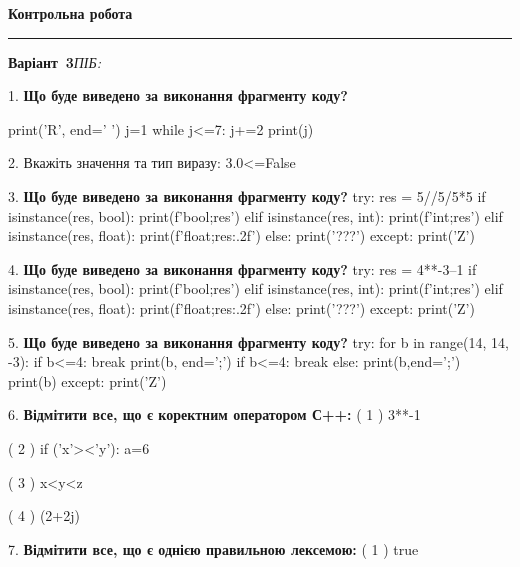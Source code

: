 \documentclass[11pt]{article}
\begin{document}
{\centering\Large\bfseries Контрольна робота\par}
\medskip
\noindent\rule{\linewidth}{0.5pt}
\smallskip
\noindent\textbf{Варіант \No\,3}\hfill \textit{ПІБ:}\,\underline{\hspace{60mm}}
\vspace{4mm}

1. \textbf{Що буде виведено за виконання фрагменту коду?}

print('R', end=' ')
j=1
while j<=7:
    j+=2
print(j)

\vspace{5mm}

2. 
Вкажіть значення та тип виразу:
3.0<=False
\vspace{5mm}

3. \textbf{Що буде виведено за виконання фрагменту коду?}
try:
    res = 5//5/5*5
    if isinstance(res, bool):
        print(f'bool;{res}')
    elif isinstance(res, int):
        print(f'int;{res}')
    elif isinstance(res, float):
        print(f'float;{res:.2f}')
    else:
        print('???')
except:
    print('Z')
\vspace{5mm}

4. \textbf{Що буде виведено за виконання фрагменту коду?}
try:
    res = 4**-3--1
    if isinstance(res, bool):
        print(f'bool;{res}')
    elif isinstance(res, int):
        print(f'int;{res}')
    elif isinstance(res, float):
        print(f'float;{res:.2f}')
    else:
        print('???')
except:
    print('Z')
\vspace{5mm}

5. \textbf{Що буде виведено за виконання фрагменту коду?}
try:
    for b in range(14, 14, -3):
        if b<=4:
            break
        print(b, end=';')
        if b<=4:
            break
    else:
        print(b,end=';')
    print(b)
except:
    print('Z')
\vspace{5mm}

6. %
\textbf{Відмітити все, що є коректним оператором С++:}
( 1 ) 3**-1

( 2 ) if ('x'><'y'): a=6

( 3 ) x<y<z

( 4 ) (2+2j)%
\vspace{5mm}

7. %
\textbf{Відмітити все, що є однією правильною лексемою:}
( 1 ) true
\end{document}
